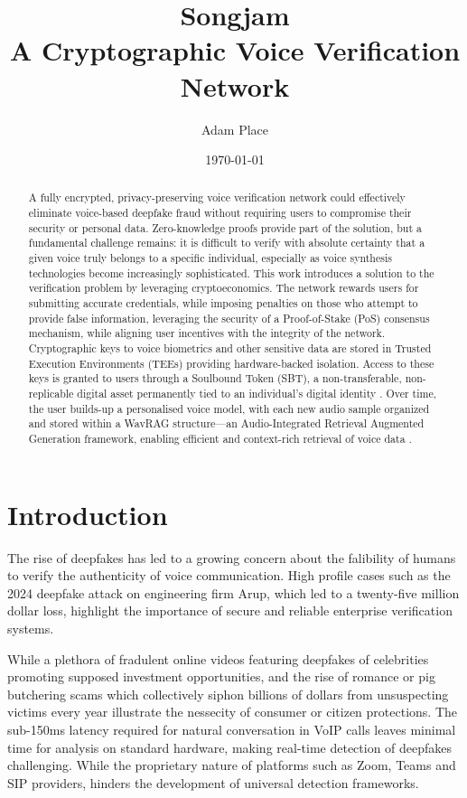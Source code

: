 \documentclass[11pt,a4paper]{article}
\title{Songjam\\[0.5em]\large A Cryptographic Voice Verification Network}
\author{Adam Place}
\date{\today}
\begin{document}
\maketitle

\begin{abstract}
A fully encrypted, privacy-preserving voice verification network could effectively eliminate voice-based deepfake fraud without requiring users to compromise their security or personal data.
Zero-knowledge proofs provide part of the solution, but a fundamental challenge remains: it is difficult to verify with absolute certainty that a given voice truly belongs to a specific individual, especially as voice synthesis technologies become increasingly sophisticated.
This work introduces a solution to the verification problem by leveraging cryptoeconomics.
The network rewards users for submitting accurate credentials, while imposing penalties on those who attempt to provide false information, leveraging the security of a Proof-of-Stake (PoS) consensus mechanism, while aligning user incentives with the integrity of the network.
Cryptographic keys to voice biometrics and other sensitive data are stored in Trusted Execution Environments (TEEs) providing hardware-backed isolation.
Access to these keys is granted to users through a Soulbound Token (SBT), a non-transferable, non-replicable digital asset permanently tied to an individual's digital identity \cite{buterin2022soulbound}.
Over time, the user builds-up a personalised voice model, with each new audio sample organized and stored within a WavRAG structure---an Audio-Integrated Retrieval Augmented Generation framework, enabling efficient and context-rich retrieval of voice data \cite{chen2025wavrag}.
\end{abstract}

\section{Introduction}
\label{sec:introduction}
The rise of deepfakes has led to a growing concern about the falibility of humans to verify the authenticity of voice communication.
High profile cases such as the 2024 deepfake attack on engineering firm Arup, which led to a twenty-five million dollar loss, highlight the importance of secure and reliable enterprise verification systems.

While a plethora of fradulent online videos featuring deepfakes of celebrities promoting supposed investment opportunities, and the rise of romance or \textquotesingle pig butchering\textquotesingle{} scams which collectively siphon billions of dollars from unsuspecting victims every year illustrate the nessecity of consumer or citizen protections.
The sub-150ms latency required for natural conversation in VoIP calls leaves minimal time for analysis on standard hardware, making real-time detection of deepfakes challenging. While the proprietary nature of platforms such as Zoom, Teams and SIP providers, hinders the development of universal detection frameworks.
\end{document}

